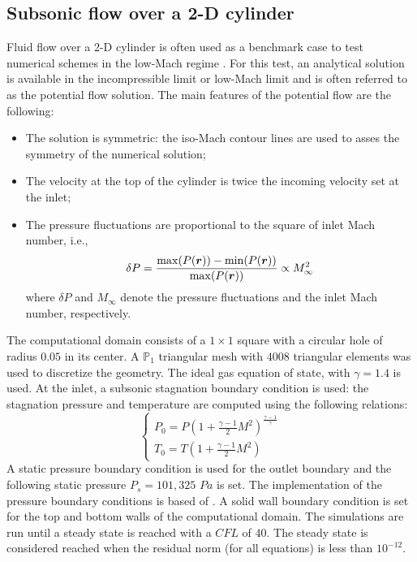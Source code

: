 \subsection{Subsonic flow over a 2-D cylinder} \label{sec:cylinder}
Fluid flow over a 2-D cylinder is often used as a benchmark case to test numerical schemes in the low-Mach regime \cite{LowMach1, LowMach2, LowMach3}. For this test, an analytical solution is available in the incompressible limit or low-Mach limit and is often referred to as the potential flow solution. The main features of the potential flow are the following:
%
\begin{itemize}
\item The solution is symmetric: the iso-Mach contour lines are used to asses the symmetry of the numerical solution;
\item The velocity at the top of the cylinder is twice the incoming velocity set at the inlet;
\item The pressure fluctuations are proportional to the square of inlet Mach number, i.e., 
\begin{equation}
\delta P = \frac{\max(P(\boldsymbol r)) - \min(P(\boldsymbol r))}{\max(P(\boldsymbol r))}  \propto M_\infty^2
\end{equation}
where $\delta P$ and $M_\infty$ denote the pressure fluctuations and the inlet Mach number, respectively.
\end{itemize}
%
The computational domain consists of a $1\times 1$ square with a circular hole of radius $0.05$ in its center. A $\mathbb{P}_1$ triangular mesh with $4008$ triangular elements was used to discretize the geometry. The ideal gas equation of state, with $\gamma=1.4$ is used. At the inlet, a subsonic stagnation boundary condition is used: the stagnation pressure and temperature are computed using the following relations:
%
\begin{equation}
\label{eq:stagnation_relations}
\left\{
\begin{array}{l}
P_0 = P\left( 1 + \frac{\gamma-1}{2} M^2 \right)^{\frac{\gamma-1}{\gamma}} \\
T_0 = T\left( 1 + \frac{\gamma-1}{2} M^2 \right)
\end{array}
\right.
\end{equation}
%
A static pressure boundary condition is used for the outlet boundary and the following static pressure $P_s = 101,325$ $Pa$ is set. The implementation of the pressure boundary conditions is based of \cite{SEM}. A solid wall boundary condition is set for the top and bottom walls of the computational domain. The simulations are run until a steady state is reached with a $CFL$ of $40$. The steady state is considered reached when the residual norm  (for all equations) is less than $10^{-12}$.

